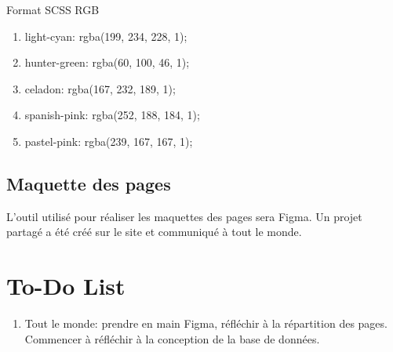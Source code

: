 \documentclass{report}
\begin{document}
\vspace{15mm}

Format SCSS RGB
\begin{enumerate}
    \item light-cyan: rgba(199, 234, 228, 1);
    \item hunter-green: rgba(60, 100, 46, 1);
    \item celadon: rgba(167, 232, 189, 1);
    \item spanish-pink: rgba(252, 188, 184, 1);
    \item pastel-pink: rgba(239, 167, 167, 1);
\end{enumerate}

\subsection{Maquette des pages}

L'outil utilisé pour réaliser les maquettes des pages sera Figma. Un projet partagé a été créé sur le site et communiqué à tout le monde.

\section{To-Do List}

\begin{enumerate}
    \item Tout le monde: prendre en main Figma, réfléchir à la répartition des pages. Commencer à réfléchir à la conception de la base de données.
\end{enumerate}
\end{document}
